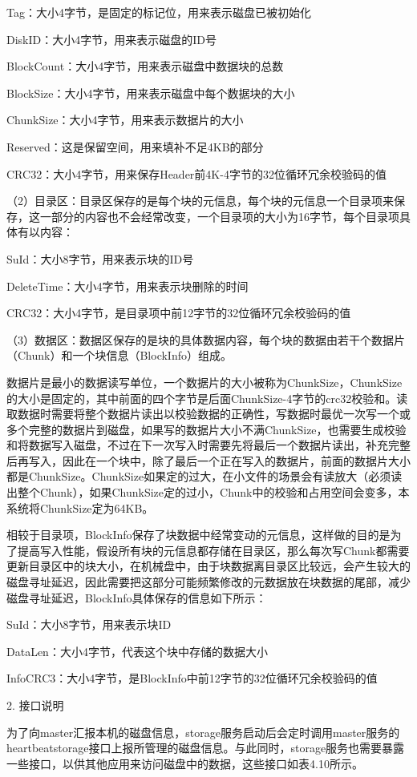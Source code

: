 Tag：大小4字节，是固定的标记位，用来表示磁盘已被初始化

DiskID：大小4字节，用来表示磁盘的ID号

BlockCount：大小4字节，用来表示磁盘中数据块的总数

BlockSize：大小4字节，用来表示磁盘中每个数据块的大小

ChunkSize：大小4字节，用来表示数据片的大小

Reserved：这是保留空间，用来填补不足4KB的部分

CRC32：大小4字节，用来保存Header前4K-4字节的32位循环冗余校验码的值

（2）目录区：目录区保存的是每个块的元信息，每个块的元信息一个目录项来保存，这一部分的内容也不会经常改变，一个目录项的大小为16字节，每个目录项具体有以内容：

SuId：大小8字节，用来表示块的ID号

DeleteTime：大小4字节，用来表示块删除的时间

CRC32：大小4字节，是目录项中前12字节的32位循环冗余校验码的值

（3）数据区：数据区保存的是块的具体数据内容，每个块的数据由若干个数据片（Chunk）和一个块信息（BlockInfo）组成。

数据片是最小的数据读写单位，一个数据片的大小被称为ChunkSize，ChunkSize的大小是固定的，其中前面的四个字节是后面ChunkSize-4字节的crc32校验和。读取数据时需要将整个数据片读出以校验数据的正确性，写数据时最优一次写一个或多个完整的数据片到磁盘，如果写的数据片大小不满ChunkSize，也需要生成校验和将数据写入磁盘，不过在下一次写入时需要先将最后一个数据片读出，补充完整后再写入，因此在一个块中，除了最后一个正在写入的数据片，前面的数据片大小都是ChunkSize。ChunkSize如果定的过大，在小文件的场景会有读放大（必须读出整个Chunk），如果ChunkSize定的过小，Chunk中的校验和占用空间会变多，本系统将ChunkSize定为64KB。

相较于目录项，BlockInfo保存了块数据中经常变动的元信息，这样做的目的是为了提高写入性能，假设所有块的元信息都存储在目录区，那么每次写Chunk都需要更新目录区中的块大小，在机械盘中，由于块数据离目录区比较远，会产生较大的磁盘寻址延迟，因此需要把这部分可能频繁修改的元数据放在块数据的尾部，减少磁盘寻址延迟，BlockInfo具体保存的信息如下所示：

SuId：大小8字节，用来表示块ID

DataLen：大小4字节，代表这个块中存储的数据大小

InfoCRC3：大小4字节，是BlockInfo中前12字节的32位循环冗余校验码的值

2. 接口说明

为了向master汇报本机的磁盘信息，storage服务启动后会定时调用master服务的heartbeatstorage接口上报所管理的磁盘信息。与此同时，storage服务也需要暴露一些接口，以供其他应用来访问磁盘中的数据，这些接口如表4.10所示。

